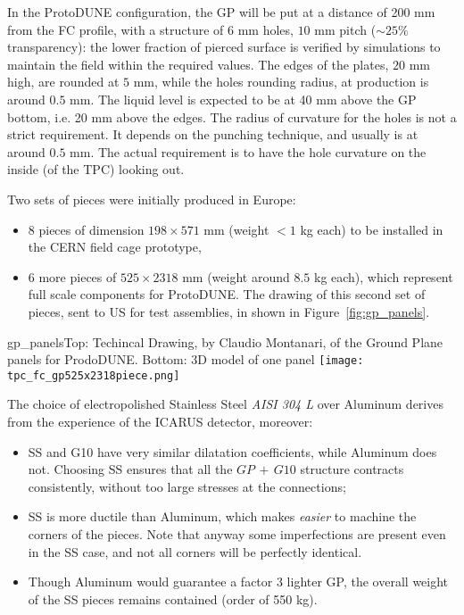 In the ProtoDUNE configuration, the GP will be put at a distance of 200 mm from the FC profile, with a structure of $6$ mm holes, $10$ mm pitch ($\sim 25\%$ transparency): the lower fraction of pierced surface is verified by simulations to maintain the field within the required values. The edges of the plates, $20$ mm high, are rounded at $5$ mm, while the holes rounding radius, at production is around $0.5$ mm. The liquid level is expected to be at 40 mm above the GP bottom, i.e. 20 mm above the edges. The radius of curvature for the holes is not a strict requirement. It depends on the punching technique, and usually is at around $0.5$ mm. The actual requirement is to have the hole curvature on the inside (of the TPC) looking out.

Two sets of pieces were initially produced in Europe:
\begin{itemize}
\item 8 pieces of dimension $198 \times 571$ mm (weight $< 1$ kg each) to be installed in the CERN field cage prototype,
\item 6 more pieces of  $525 \times 2318$ mm (weight around $8.5$ kg each), which represent full scale components for ProtoDUNE. The drawing of this second set of pieces, sent to US for test assemblies, in shown in Figure~\ref{fig:gp_panels}.
\end{itemize}

\begin{cdrfigure}[ProtoDUNE GP]{gp_panels}{Top: Techincal Drawing, by Claudio Montanari, of the Ground Plane panels for ProdoDUNE. Bottom: 3D model of one panel}
\texttt{[image: tpc\_fc\_gp525x2318piece.png]}
\end{cdrfigure}


The choice of electropolished Stainless Steel \textit{AISI 304 L} over Aluminum derives from the experience of the ICARUS detector, moreover:
\begin{itemize}
\item SS and G10 have very similar dilatation coefficients, while Aluminum does not. Choosing SS ensures that all the $GP\,+\,G10$ structure contracts consistently, without too large stresses at the connections; 
\item SS is more ductile than Aluminum, which makes \textit{easier} to machine the corners of the pieces. Note that anyway some imperfections are present even in the SS case, and not all corners will be perfectly identical. 
\item Though Aluminum would guarantee a factor 3 lighter GP, the overall weight of the SS pieces remains contained (order of 550 kg).
\end{itemize}

